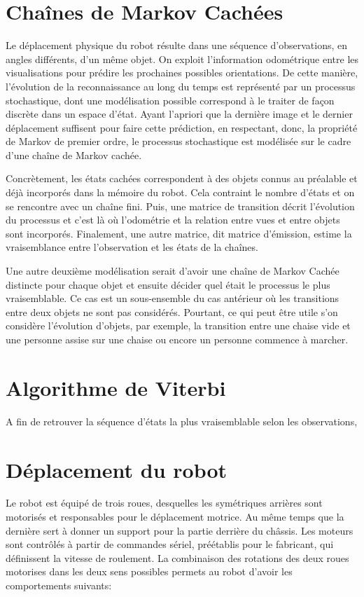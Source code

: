 \section {Chaînes de Markov Cachées}

Le déplacement physique du robot résulte dans une séquence
d'observations, en angles différents, d'un même objet. On exploit
l'information odométrique entre les visualisations pour prédire les
prochaines possibles orientations. De cette manière, l'évolution de la
reconnaissance au long du temps est représenté par un processus
stochastique, dont une modélisation possible correspond à le traiter
de façon discrète dans un espace d'état. Ayant l'apriori que la
dernière image et le dernier déplacement suffisent pour faire cette
prédiction, en respectant, donc, la propriété de Markov de premier
ordre, le processus stochastique est modélisée sur le cadre d'une
chaîne de Markov cachée.

Concrètement, les états cachées correspondent à des objets connus au
préalable et déjà incorporés dans la mémoire du robot. Cela contraint le
nombre d'états et on se rencontre avec un chaîne fini. Puis, une
matrice de transition décrit l'évolution du processus et c'est là où
l'odométrie et la relation entre vues et entre objets sont
incorporés. Finalement, une autre matrice, dit matrice d'émission,
estime la vraisemblance entre l'observation et les états de la
chaînes.

Une autre deuxième modélisation serait d'avoir une chaîne de Markov
Cachée distincte pour chaque objet et ensuite décider quel était le
processus le plus vraisemblable. Ce cas est un sous-ensemble du cas
antérieur où les transitions entre deux objets ne sont pas
considérés. Pourtant, ce qui peut être utile s'on considère
l'évolution d'objets, par exemple, la transition entre une chaise vide
et une personne assise sur une chaise ou encore un personne
commence à marcher.

{\color{green} 
\section{Algorithme de Viterbi}
A fin de retrouver la séquence d'états la plus vraisemblable selon les
observations, 
}

\section{Déplacement du robot}

Le robot est équipé de trois roues, desquelles les symétriques
arrières sont motorisés et responsables pour le déplacement
motrice. Au même temps que la dernière sert à donner un support pour
la partie derrière du châssis. Les moteurs sont contrôlés à
partir de commandes sériel, préétablis pour le fabricant, qui
définissent la vitesse de roulement. La combinaison des rotations
des deux roues motorises dans les deux sens possibles permets au
robot d'avoir les comportements suivants:

